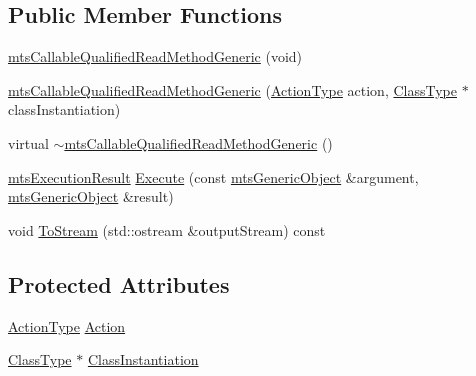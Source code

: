 \subsection*{Public Member Functions}
\begin{DoxyCompactItemize}
\item 
\hyperlink{classmts_callable_qualified_read_method_generic_a37061746218d1cec908ce78393d4fe56}{mts\+Callable\+Qualified\+Read\+Method\+Generic} (void)
\item 
\hyperlink{classmts_callable_qualified_read_method_generic_a952cdaf09a287de112a758b9f5c36c20}{mts\+Callable\+Qualified\+Read\+Method\+Generic} (\hyperlink{classmts_callable_qualified_read_method_generic_afe3373d95d9a97f9737078e041f945d8}{Action\+Type} action, \hyperlink{classmts_callable_qualified_read_method_generic_ada2d394b00a2db849dd5d67b965fd63b}{Class\+Type} $\ast$class\+Instantiation)
\item 
virtual \hyperlink{classmts_callable_qualified_read_method_generic_a98261d23e50a97a2923ee04f8ffd193a}{$\sim$mts\+Callable\+Qualified\+Read\+Method\+Generic} ()
\item 
\hyperlink{classmts_execution_result}{mts\+Execution\+Result} \hyperlink{classmts_callable_qualified_read_method_generic_a489b1a5368c0e7533f634830723fe0af}{Execute} (const \hyperlink{classmts_generic_object}{mts\+Generic\+Object} \&argument, \hyperlink{classmts_generic_object}{mts\+Generic\+Object} \&result)
\item 
void \hyperlink{classmts_callable_qualified_read_method_generic_a7c8f5ed8525397fdfeda642e0d3888d1}{To\+Stream} (std\+::ostream \&output\+Stream) const 
\end{DoxyCompactItemize}
\subsection*{Protected Attributes}
\begin{DoxyCompactItemize}
\item 
\hyperlink{classmts_callable_qualified_read_method_generic_afe3373d95d9a97f9737078e041f945d8}{Action\+Type} \hyperlink{classmts_callable_qualified_read_method_generic_a39b88372b35325f8ed51a406e42b9c51}{Action}
\item 
\hyperlink{classmts_callable_qualified_read_method_generic_ada2d394b00a2db849dd5d67b965fd63b}{Class\+Type} $\ast$ \hyperlink{classmts_callable_qualified_read_method_generic_aa2cc99ad37b816f02a8287a26e3f22b0}{Class\+Instantiation}
\end{DoxyCompactItemize}


